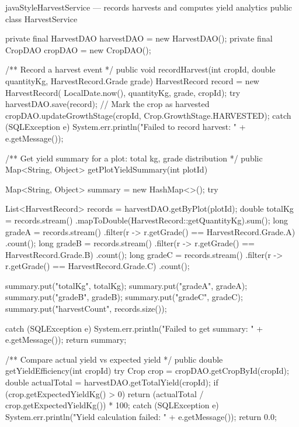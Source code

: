 \documentclass[12pt, a4paper]{report}
\begin{document}
\begin{codeblock}{javaStyle}{HarvestService --- records harvests and computes yield analytics}
public class HarvestService {
    private final HarvestDAO harvestDAO = new HarvestDAO();
    private final CropDAO    cropDAO    = new CropDAO();

    /** Record a harvest event */
    public void recordHarvest(int cropId, double quantityKg,
                              HarvestRecord.Grade grade) {
        HarvestRecord record = new HarvestRecord(
            LocalDate.now(), quantityKg, grade, cropId);
        try {
            harvestDAO.save(record);
            // Mark the crop as harvested
            cropDAO.updateGrowthStage(cropId,
                Crop.GrowthStage.HARVESTED);
        } catch (SQLException e) {
            System.err.println("Failed to record harvest: "
                + e.getMessage());
        }
    }

    /** Get yield summary for a plot: total kg, grade distribution */
    public Map<String, Object> getPlotYieldSummary(int plotId) {
        Map<String, Object> summary = new HashMap<>();
        try {
            List<HarvestRecord> records =
                harvestDAO.getByPlot(plotId);
            double totalKg = records.stream()
                .mapToDouble(HarvestRecord::getQuantityKg).sum();
            long gradeA = records.stream()
                .filter(r -> r.getGrade() == HarvestRecord.Grade.A)
                .count();
            long gradeB = records.stream()
                .filter(r -> r.getGrade() == HarvestRecord.Grade.B)
                .count();
            long gradeC = records.stream()
                .filter(r -> r.getGrade() == HarvestRecord.Grade.C)
                .count();

            summary.put("totalKg", totalKg);
            summary.put("gradeA", gradeA);
            summary.put("gradeB", gradeB);
            summary.put("gradeC", gradeC);
            summary.put("harvestCount", records.size());
        } catch (SQLException e) {
            System.err.println("Failed to get summary: "
                + e.getMessage());
        }
        return summary;
    }

    /** Compare actual yield vs expected yield */
    public double getYieldEfficiency(int cropId) {
        try {
            Crop crop = cropDAO.getCropById(cropId);
            double actualTotal = harvestDAO.getTotalYield(cropId);
            if (crop.getExpectedYieldKg() > 0) {
                return (actualTotal / crop.getExpectedYieldKg()) * 100;
            }
        } catch (SQLException e) {
            System.err.println("Yield calculation failed: "
                + e.getMessage());
        }
        return 0.0;
    }
}
\end{codeblock}
\end{document}
